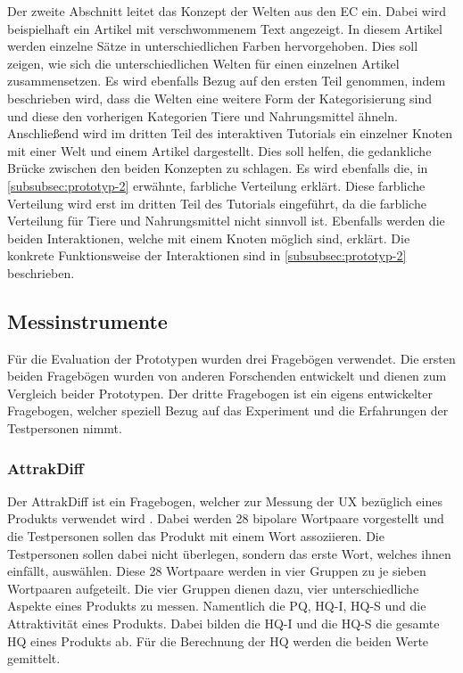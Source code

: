 Der zweite Abschnitt leitet das Konzept der Welten aus den \ac{EC} ein.
Dabei wird beispielhaft ein Artikel mit verschwommenem Text angezeigt.
In diesem Artikel werden einzelne Sätze in unterschiedlichen Farben hervorgehoben.
Dies soll zeigen, wie sich die unterschiedlichen Welten für einen einzelnen Artikel zusammensetzen.
Es wird ebenfalls Bezug auf den ersten Teil genommen, indem beschrieben wird, dass die Welten eine weitere Form der Kategorisierung sind und diese den vorherigen Kategorien Tiere und Nahrungsmittel ähneln.\\

Anschließend wird im dritten Teil des interaktiven Tutorials ein einzelner Knoten mit einer Welt und einem Artikel dargestellt.
Dies soll helfen, die gedankliche Brücke zwischen den beiden Konzepten zu schlagen.
Es wird ebenfalls die, in \autoref{subsubsec:prototyp-2} erwähnte, farbliche Verteilung erklärt.
Diese farbliche Verteilung wird erst im dritten Teil des Tutorials eingeführt, da die farbliche Verteilung für Tiere und Nahrungsmittel nicht sinnvoll ist.
Ebenfalls werden die beiden Interaktionen, welche mit einem Knoten möglich sind, erklärt.
Die konkrete Funktionsweise der Interaktionen sind in \autoref{subsubsec:prototyp-2} beschrieben.\\

\subsection{Messinstrumente}
Für die Evaluation der Prototypen wurden drei Fragebögen verwendet.
Die ersten beiden Fragebögen wurden von anderen Forschenden entwickelt und dienen zum Vergleich beider Prototypen.
Der dritte Fragebogen ist ein eigens entwickelter Fragebogen, welcher speziell Bezug auf das Experiment und die Erfahrungen der Testpersonen nimmt.\\

\subsubsection{AttrakDiff}
Der AttrakDiff ist ein Fragebogen, welcher zur Messung der \ac{UX} bezüglich eines Produkts verwendet wird \cite{attrakdiff-2000, attrakdiff-2003, attrakdiff-2008}.
Dabei werden 28 bipolare Wortpaare vorgestellt und die Testpersonen sollen das Produkt mit einem Wort assoziieren.
Die Testpersonen sollen dabei nicht überlegen, sondern das erste Wort, welches ihnen einfällt, auswählen.
Diese 28 Wortpaare werden in vier Gruppen zu je sieben Wortpaaren aufgeteilt.
Die vier Gruppen dienen dazu, vier unterschiedliche Aspekte eines Produkts zu messen.
Namentlich die \ac{PQ}, \ac{HQ-I}, \ac{HQ-S} und die Attraktivität eines Produkts.
Dabei bilden die \ac{HQ-I} und die \ac{HQ-S} die gesamte \ac{HQ} eines Produkts ab.
Für die Berechnung der \ac{HQ} werden die beiden Werte gemittelt. \\

